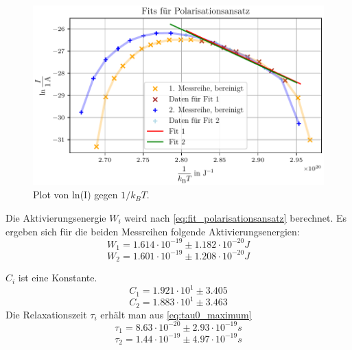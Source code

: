 \begin{figure}[H]
    \centering
    \includegraphics[width=\textwidth]{plots/G_polarisationsansatz.pdf}
    \caption{Plot von ln(I) gegen $1/k_BT$.}
    \label{fig:Polarisationsansatz}
\end{figure}

Die Aktivierungsenergie $W_i$ weird nach \ref{eq:fit_polarisationsansatz} berechnet.
Es ergeben sich für die beiden Messreihen folgende Aktivierungsenergien:
\begin{equation}
W_1 = 1.614\cdot10^{-19}\pm1.182\cdot10^{-20} J
\end{equation}
\begin{equation}
W_2 = 1.601\cdot10^{-19}\pm1.208\cdot10^{-20} J
\end{equation}

$C_i$ ist eine Konstante.
\begin{equation}
C_1 = 1.921\cdot10^1\pm3.405
\end{equation}
\begin{equation}
C_2 = 1.883\cdot10^1\pm3.463
\end{equation}
Die Relaxationszeit $\tau_i$ erhält man aus \ref{eq:tau0_maximum}
\begin{equation}
\tau_1 =  8.63\cdot10^{-20}\pm2.93\cdot10^{-19} s
\end{equation}
\begin{equation}
\tau_2 =  1.44\cdot10^{-19}\pm4.97\cdot10^{-19} s
\end{equation}

